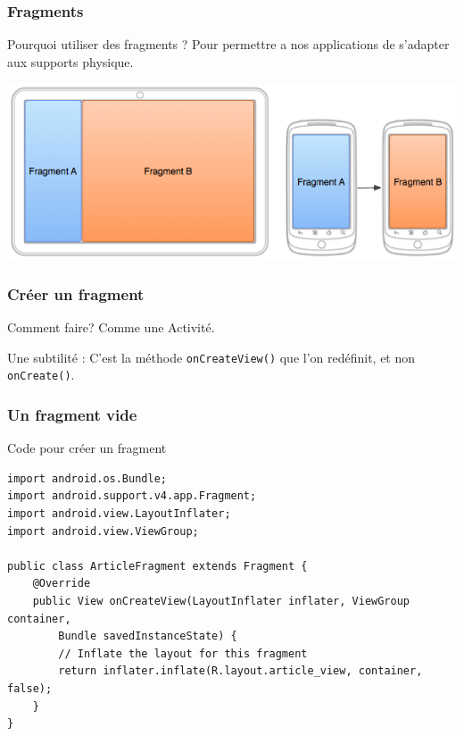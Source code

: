\documentclass{beamer}
\begin{document}
\begin{frame}
\frametitle{Fragments}

\begin{block}{Pourquoi utiliser des fragments ?}
Pour permettre a nos applications de s'adapter aux supports physique.
\end{block}

\begin{center}
\includegraphics[scale=0.5]{fragments-screen-mock.png}
\end{center}
\end{frame}

\begin{frame}
\frametitle{Créer un fragment}
\begin{block}{Comment faire?}
Comme une Activité.
\end{block}

\begin{block}{Une subtilité :}
C'est la méthode \verb!onCreateView()! que l'on redéfinit, et non \verb!onCreate()!.
\end{block}
\end{frame}


\begin{frame}[fragile]
\frametitle{Un fragment vide}
\begin{block}{Code pour créer un fragment}
\lstset{language=java}
\begin{lstlisting}
import android.os.Bundle;
import android.support.v4.app.Fragment;
import android.view.LayoutInflater;
import android.view.ViewGroup;

public class ArticleFragment extends Fragment {
    @Override
    public View onCreateView(LayoutInflater inflater, ViewGroup container,
        Bundle savedInstanceState) {
        // Inflate the layout for this fragment
        return inflater.inflate(R.layout.article_view, container, false);
    }
}
\end{lstlisting}
\end{block}
\end{frame}
\end{document}
